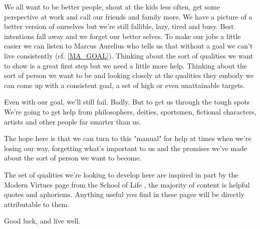 
\cleardoublepage

We all want to be better people, shout at the kids less often, get some perspective at work and call our friends and family more. We have a picture of a better version of ourselves but we're still fallible, lazy, tired and busy. Best intentions fall away and we forget our better selves. 
To make our jobs a little easier we can listen to Marcus Aurelius who tells us that without a goal we can't live consistently (cf. \ref{MA_GOAL}). Thinking about the sort of qualities we want to show is a great first step but we need a little more help. Thinking about the sort of person we want to be and looking closely at the qualities they embody we can come up with a consistent goal, a set of high or even unattainable targets. 

Even with our goal, we'll still fail. Badly. But to get us through the tough spots We're going to get help from philosophers, deities, sportsmen, fictional characters, artists and other people far smarter than us. 

The hope here is that we can turn to this "manual" for help at times when we're losing our way, forgetting what's important to us and the promises we've made about the sort of person we want to become.

The set of qualities we're looking to develop here are inspired in part by the Modern Virtues page from the School of Life , the majority of content is helpful quotes and aphorisms. Anything useful you find in these pages will be directly attributable to them. 

Good luck, and live well.